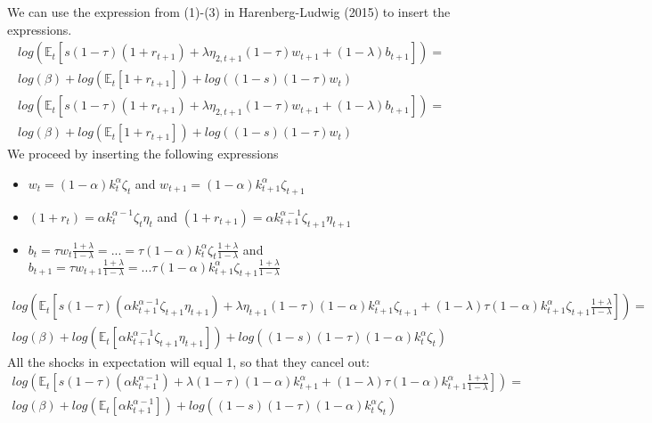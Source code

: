 \documentclass[12pt,a4paper]{article}
\begin{document}
We can use the expression from (1)-(3) in Harenberg-Ludwig (2015) to insert the expressions.
\pagebreak
\begin{align*}
          log\left( \mathbb{E}_t\left[ s(1-\tau)(1+r_{t+1}) + \lambda\eta_{2,t+1}(1-\tau)w_{t+1} + (1-\lambda)b_{t+1}\right]\right) = \\          log\left(\beta\right) + log\left( \mathbb{E}_t \left[1+r_{t+1}\right]\right) + log\left( (1-s)(1-\tau)w_t \right)
\end{align*}
\begin{align*}
          log\left( \mathbb{E}_t\left[ s(1-\tau)(1+r_{t+1}) + \lambda\eta_{2,t+1}(1-\tau)w_{t+1} + (1-\lambda)b_{t+1} \right]\right) = \\          log\left(\beta\right) +  log\left( \mathbb{E}_t \left[1+r_{t+1}\right]\right) + log\left( (1-s)(1-\tau)w_t \right)
\end{align*}
We proceed by inserting the following expressions
\begin{itemize}
    \item $w_t =(1-\alpha)k_t^\alpha\zeta_t$ and $w_{t+1}=(1-\alpha)k_{t+1}^\alpha\zeta_{t+1}$
    \item $(1 +r_t) =\alpha k_t^{\alpha -1 }\zeta_t\eta_t$ and $(1+r_{t+1}) = \alpha k_{t+1}^{\alpha -1 }\zeta_{t+1}\eta_{t+1}$
    \item $b_t = \tau w_t \frac{1+\lambda}{1-\lambda} = ... =\tau (1-\alpha)k_t^\alpha\zeta_t \frac{1+\lambda}{1-\lambda}  $ and\\
    $b_{t+1} = \tau w_{t+1} \frac{1+\lambda}{1-\lambda} = ... \tau (1-\alpha)k_{t+1}^\alpha\zeta_{t+1} \frac{1+\lambda}{1-\lambda} $
\end{itemize}
\begin{align*}
          log\left( \mathbb{E}_t\left[ s(1-\tau)(\alpha k_{t+1}^{\alpha -1 }\zeta_{t+1}\eta_{t+1}) + \lambda\eta_{t+1}(1-\tau)(1-\alpha)k_{t+1}^\alpha\zeta_{t+1} + (1-\lambda)\tau (1-\alpha)k_{t+1}^\alpha\zeta_{t+1} \frac{1+\lambda}{1-\lambda} \right]\right) = \\          log\left(\beta\right) +  log\left( \mathbb{E}_t \left[\alpha k_{t+1}^{\alpha -1 }\zeta_{t+1}\eta_{t+1}\right]\right) + log\left( (1-s)(1-\tau)(1-\alpha)k_t^\alpha\zeta_t \right)
\end{align*}
All the shocks in expectation will equal 1, so that they cancel out:
\begin{align*}
          log\left( \mathbb{E}_t\left[ s(1-\tau)(\alpha k_{t+1}^{\alpha -1 }) + \lambda(1-\tau)(1-\alpha)k_{t+1}^\alpha+ (1-\lambda)\tau (1-\alpha)k_{t+1}^\alpha \frac{1+\lambda}{1-\lambda} \right]\right) = \\          log\left(\beta\right) +  log\left( \mathbb{E}_t \left[\alpha k_{t+1}^{\alpha -1 }\right]\right) + log\left( (1-s)(1-\tau)(1-\alpha)k_t^\alpha\zeta_t \right)
\end{align*}
\end{document}
